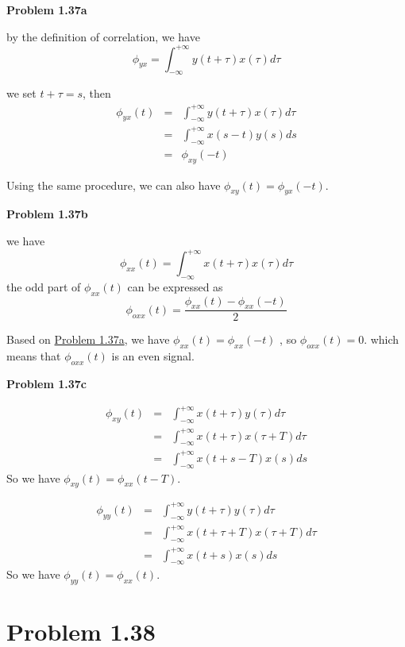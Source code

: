\documentclass[koma,a4paper,utopia,12pt,listings-color,microtype,paralist,colorlinks,urlcolor=red]{org-article}
\begin{document}
\textbf{Problem 1.37a} \label{Problem 1.37a}

by the definition of correlation, we have
\begin{equation*}
\phi_{yx} = \int_{-\infty}^{+\infty} y(t + \tau)x(\tau) d \tau
\end{equation*}

we set \(t+ \tau = s\), then
\begin{eqnarray*}
\phi_{yx}(t) &=& \int_{-\infty}^{+\infty} y(t + \tau)x(\tau) d \tau \\
&=& \int_{-\infty}^{+\infty} x(s-t) y(s) ds \\
&=& \phi_{xy}(-t)
\end{eqnarray*}

Using the same procedure, we can also have \(\phi_{xy}(t) = \phi_{yx}(-t)\).

\textbf{Problem 1.37b}

we have
\begin{equation*}
\phi_{xx}(t) = \int_{-\infty}^{+\infty} x(t+\tau)x(\tau) d\tau
\end{equation*}
the odd part of \(\phi_{xx}(t)\) can be expressed as
\begin{equation*}
\phi_{oxx}(t) = \frac{\phi_{xx}(t) - \phi_{xx}(-t)}{2}
\end{equation*}

Based on \hyperref[Problem 1.37a]{Problem 1.37a}, we have \(\phi_{xx}(t) = \phi_{xx}(-t)\) , so
\(\phi_{oxx}(t) = 0\). which means that \(\phi_{oxx}(t)\) is an even signal.

\textbf{Problem 1.37c}

\begin{eqnarray*}
\phi_{xy}(t) &=& \int_{-\infty}^{+\infty} x(t+ \tau) y(\tau)d\tau \\
&=& \int_{-\infty}^{+\infty} x(t+ \tau) x(\tau + T)d\tau \\
&=& \int_{-\infty}^{+\infty} x(t + s -T) x(s) ds
\end{eqnarray*}
So we have \(\phi_{xy}(t) = \phi_{xx}(t-T)\).

\begin{eqnarray*}
\phi_{yy}(t) &=& \int_{-\infty}^{+\infty} y(t+ \tau) y(\tau)d\tau \\
&=& \int_{-\infty}^{+\infty} x(t+ \tau + T) x(\tau + T)d\tau \\
&=& \int_{-\infty}^{+\infty} x(t + s) x(s) ds
\end{eqnarray*}
So we have \(\phi_{yy}(t) = \phi_{xx}(t)\).
\section{Problem 1.38}
\label{sec:org977ea11}
\end{document}

